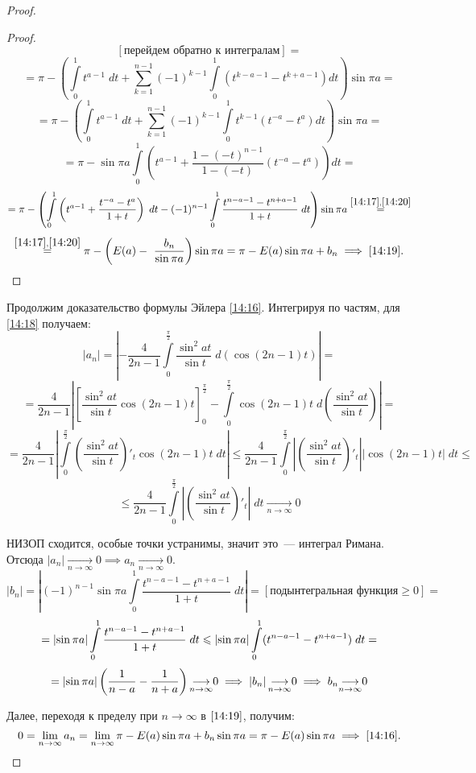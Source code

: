 \documentclass[../../main.tex]{subfiles}
\begin{document}
\begin{proof}
\begin{proof}
\[				[\text{перейдем обратно к интегралам}] = \]
				\[ = \pi - \left( \int\limits_{0}^{1} t^{a-1} \; dt + \sum_{k=1}^{n-1} 
				(-1)^{k-1} \int\limits_{0}^{1} \left( t^{k-a-1} - t^{k+a - 1} \right) dt 
				\right)  \sin{\pi a}  = \]
				\[  =  \pi - \left( \int\limits_{0}^{1} t^{a-1} \; dt + \sum_{k=1}^{n-1} 
				(-1)^{k-1} \int\limits_{0}^{1} t^{k-1} \left( t^{-a} - t^{a} \right) dt 
				\right)  \sin{\pi a} =  \]
				\[  = \pi - \sin{\pi a} \int\limits_{0}^{1} \left( t^{a-1} + 
				\frac{1-(-t)^{n-1}}{1-(-t)}\left( t^{-a} - t^{a} \right) \right) dt  = \]
				\[ = \pi - \left( \int\limits_{0}^{1} \left( t^{a-1} + \frac{t^{-a} - 
				t^a}{1+t} \right) \; dt - (-1)^{n-1} \int\limits_{0}^{1} \frac{t^{n-a-1} - 
				t^{n+a-1}}{1+t} \; dt   \right) \sin{\pi a}  \stackrel{\eqref{14:17}, 
				\eqref{14:20}}= \]
				\[ \stackrel{\eqref{14:17}, \eqref{14:20}}= \pi - \left( E(a) - \
				\frac{b_n}{ \sin{\pi a}} 
				\right) \sin{\pi a} = \pi - E(a) \sin{\pi a} + b_n \implies 
				\eqref{14:19}. 
				\qedhere \]
			\end{proof}	
			
		Продолжим доказательство формулы Эйлера \eqref{14:16}. Интегрируя по 
		частям, для \eqref{14:18} получаем:
		\[  \left| a_n \right|   = \left| -\frac{4}{2n-1}
		\int\limits_{0}^{\frac{\pi}{2}} 
		\frac{\sin^2{at}}{\sin{t}} \; d\left( \cos{(2n-1)t}\right)   \right|  =\]
		\[ = \frac{4}{2n-1} \left| \left[ \frac{\sin^2{at}}{\sin{t}} \cos{(2n-1)t} 
		\right]_{0}^{\frac{\pi}{2}} -\int\limits_{0}^{\frac{\pi}{2}} \cos{(2n-1)t} 
		\; d\left( \frac{\sin^2{at}}{\sin{t}} \right)   \right| =     \]
		\[  = \frac{4}{2n-1}\left| \int\limits_{0}^{\frac{\pi}{2}} \left( 
		\frac{\sin^2{at}}{\sin{t}} \right)'_t \cos{(2n-1)t} \; dt \right|  \le  
		\frac{4}{2n-1} \int\limits_{0}^{\frac{\pi}{2}} \left| \left( 
		\frac{\sin^2{at}}{\sin{t}} \right)'_t \right| \left|\cos{(2n-1)t}\right| \; 
		dt  \le\]
		\[ \le \frac{4}{2n-1} \int\limits_{0}^{\frac{\pi}{2}} \left| \left( 
		\frac{\sin^2{at}}{\sin{t}} \right)'_t \right| \; dt  {\underset{n \to 
		\infty}\rightarrow} 0 \]
		
		НИЗОП сходится, особые точки устранимы, значит это~--- интеграл Римана. 
		Отсюда 
		$\left| a_n \right|{\underset{n \to \infty}\longrightarrow} 0 \implies   a_n 
		{\underset{n \to \infty}\longrightarrow} 0$.
		\[  \left| b_n \right| = \left| (-1)^{n-1} \sin{\pi a} \int\limits_{0}^{1} 
		\frac{t^{n-a-1} - t^{n+a-1}}{1+t} \; dt \right| = \left[
		\text{подынтегральная функция} \ge 0 \right] = \]
		\[ = \left|{\sin{\pi a}}\right| \int\limits_{0}^{1} 
		\frac{t^{n-a-1} - t^{n+a-1}}{1+t} \; dt \leqslant
		\left|{\sin{\pi a}}\right| \int\limits_{0}^{1} (t^{n-a-1} - t^{n+a-1})\; dt = \]
		\[ = \left|{\sin{\pi a}}\right| \left( \frac{1}{n-a} - \frac{1}{n+a}\right)  
		{\underset{n \to \infty}\longrightarrow} 0  \implies
		\left| b_n \right| {\underset{n \to \infty}\longrightarrow} 0 \implies
		b_n  {\underset{n \to \infty}\longrightarrow} 0 \]
		
		Далее, переходя к пределу при $n \to \infty$ в $\eqref{14:19}$, получим:
		\[ 0 = \lim_{n \to \infty} a_n =  \lim_{n \to \infty} \pi - E(a) \sin{\pi a} 
		+ 
		b_n \sin{\pi a} = \pi - E(a) \sin{\pi a} \implies \eqref{14:16}. \qedhere\]
\end{proof}
\end{document}
